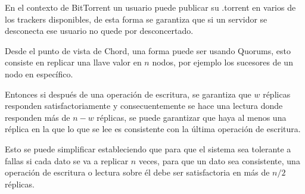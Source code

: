 \documentclass{article}
\begin{document}
En el contexto de BitTorrent un usuario puede publicar su .torrent en varios de los trackers disponibles, de esta forma se garantiza que si un servidor se desconecta ese usuario no quede por desconcertado.

Desde el punto de vista de Chord, una forma puede ser usando Quorums, esto consiste en replicar una llave valor en $n$ nodos, por ejemplo los sucesores de un nodo en específico.

Entonces si después de una operación de escritura, se garantiza que $w$ réplicas responden satisfactoriamente y consecuentemente se hace una lectura donde responden más de $n - w$ réplicas, se puede garantizar que haya al menos una réplica en la que lo que se lee es consistente con la última operación de escritura.

Esto se puede simplificar estableciendo que para que el sistema sea tolerante a fallas si cada dato se va a replicar $n$ veces, para que un dato sea consistente, una operación de escritura o lectura sobre él debe ser satisfactoria en más de $n / 2$ réplicas.
\end{document}
